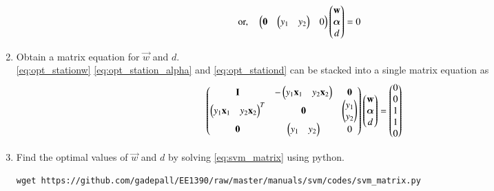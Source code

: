 \documentclass[journal,12pt,twocolumn]{IEEEtran}
\renewcommand\thesection{\arabic{section}}
\begin{document}
\begin{enumerate}[label=\thesection.\arabic*,ref=\thesection.\theenumi]
\begin{align}
\text{or,}\quad \begin{pmatrix}\mathbf{0}& \begin{pmatrix}y_1&y_2\end{pmatrix} & 0\end{pmatrix} \begin{pmatrix}\mathbf{w} 
\\\bm{\alpha} \\ d\end{pmatrix}&=0
\label{eq:opt_stationd}
\end{align}
%
\item Obtain a matrix equation  for $\vec{w}$ and $d$.
\\
\solution 
\eqref{eq:opt_stationw}
\eqref{eq:opt_station_alpha} and 
\eqref{eq:opt_stationd} can be stacked into a single matrix equation as
{\small
\begin{align}
\label{eq:svm_matrix}
\begin{pmatrix}\mathbf{I} & -\begin{pmatrix}y_1\mathbf{x}_1 & y_2\mathbf{x}_2\end{pmatrix} & \mathbf{0}
\\
\begin{pmatrix}y_1\mathbf{x}_1&y_2\mathbf{x}_2\end{pmatrix}^T & \mathbf{0} & \begin{pmatrix}y_1 \\ y_2\end{pmatrix}
\\
\mathbf{0}& \begin{pmatrix}y_1&y_2\end{pmatrix} & 0\end{pmatrix} 
\begin{pmatrix}\mathbf{w} 
\\\bm{\alpha} \\ d\end{pmatrix}=\begin{pmatrix}0 \\ 0 \\1\\1\\0\end{pmatrix} 
\end{align}
}
\item Find the optimal values of $\vec{w}$ and $d$ by solving \eqref{eq:svm_matrix} using python.
\\
\solution
\begin{lstlisting}
wget https://github.com/gadepall/EE1390/raw/master/manuals/svm/codes/svm_matrix.py
\end{lstlisting}

\end{enumerate}
\end{document}
